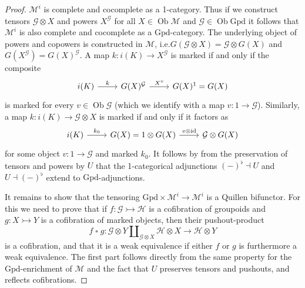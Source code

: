 \documentclass[a4paper]{article}
\theoremstyle{remark}
\theoremstyle{definition}
\begin{document}
\begin{proof}
  $\mathcal{M}^i$ is complete and cocomplete as a 1-category.
  Thus if we construct tensors $\mathcal{G} \otimes X$ and powers $X^\mathcal{G}$ for all $X \in \operatorname{Ob} \mathcal{M}$ and $\mathcal{G} \in \operatorname{Ob} \mathrm{Gpd}$ it follows that $\mathcal{M}^i$ is also complete and cocomplete as a $\mathrm{Gpd}$-category.
  The underlying object of powers and copowers is constructed in $\mathcal{M}$, i.e.\@ $G(\mathcal{G} \otimes X) = \mathcal{G} \otimes G(X)$ and $G(X^\mathcal{G}) = G(X)^\mathcal{G}$.
  A map $k : i(K) \rightarrow X^\mathcal{G}$ is marked if and only if the composite
  \begin{equation}
    \begin{tikzcd}
      i(K) \arrow[r, "k"] & G(X)^\mathcal{G} \arrow[r, "X^v"] & G(X)^1 = G(X)
    \end{tikzcd}
  \end{equation}
  is marked for every $v \in \operatorname{Ob} \mathcal{G}$ (which we identify with a map $v : 1 \rightarrow \mathcal{G}$).
  Similarly, a map $k : i(K) \rightarrow \mathcal{G} \otimes X$ is marked if and only if it factors as
  \begin{equation}
    \begin{tikzcd}
      i(K) \arrow[r, "k_0"] & G(X) = 1 \otimes G(X) \arrow[r, "v \mathbin{\otimes} \mathrm{id}"] & \mathcal{G} \otimes G(X)
    \end{tikzcd}
  \end{equation}
  for some object $v : 1 \rightarrow \mathcal{G}$ and marked $k_0$.
  It follows by \cite[Theorem 4.85]{basic-concepts-of-enriched-category-theory} from the preservation of tensors and powers by $U$ that the 1-categorical adjunctions $(-)^\flat \dashv U$ and $U \dashv (-)^\flat$ extend to $\mathrm{Gpd}$-adjunctions.

  It remains to show that the tensoring $\mathrm{Gpd} \times \mathcal{M}^i \rightarrow \mathcal{M}^i$ is a Quillen bifunctor.
  For this we need to prove that if $f : \mathcal{G} \rightarrowtail \mathcal{H}$ is a cofibration of groupoids and $g : X \rightarrowtail Y$ is a cofibration of marked objects, then their pushout-product
  \begin{equation}
    f \mathbin{\square} g : \mathcal{G} \otimes Y \amalg_{\mathcal{G} \otimes X} \mathcal{H} \otimes X \rightarrow \mathcal{H} \otimes Y
  \end{equation}
  is a cofibration, and that it is a weak equivalence if either $f$ or $g$ is furthermore a weak equivalence.
  The first part follows directly from the same property for the $\mathrm{Gpd}$-enrichment of $\mathcal{M}$ and the fact that $U$ preserves tensors and pushouts, and reflects cofibrations.


\end{proof}
\end{document}
